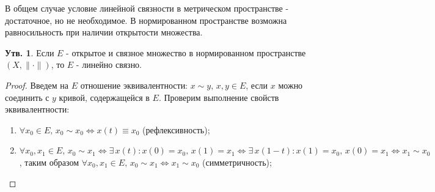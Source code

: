 \documentclass[12pt]{article}
\theoremstyle{definition}
\newtheorem{prop}{Утв.}
\begin{document}
В общем случае условие линейной связности в метрическом пространстве - достаточное, но не необходимое. В нормированном пространстве возможна равносильность при наличии открытости множества.

\begin{prop}
	Если $E$ - открытое и связное множество в нормированном пространстве $(X,\|\cdot\|)$, то $E$ - линейно связно.
\end{prop}
\begin{proof}
	Введем на $E$ отношение эквивалентности: $x \sim y, \, x, y \in E$, если $x$ можно соединить с $y$ кривой, содержащейся в $E$. Проверим выполнение свойств эквивалентности:
	\begin{enumerate}[label ={(\arabic*)}]
		\item $\forall x_0 \in E, \, x_0 \sim x_0 \Leftrightarrow x(t) \equiv x_0$ (рефлексивность);
		
		\item $\forall x_0, x_1 \in E,\, x_0 \sim x_1 \Leftrightarrow \exists \, x(t) \colon x(0) = x_0, \, x(1) = x_1 \Leftrightarrow \exists \, x(1-t) \colon x(1) = x_0, \, x(0) = x_1 \Leftrightarrow x_1 \sim x_0$, таким образом $\forall x_0, x_1 \in E,\, x_0 \sim x_1 \Leftrightarrow x_1 \sim x_0$ (симметричность);
		

\end{enumerate}
\end{proof}
\end{document}
